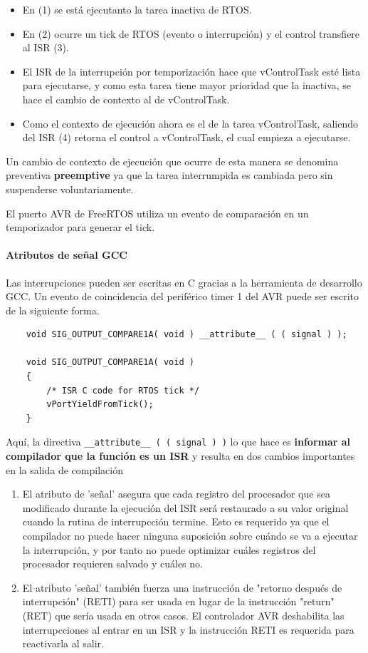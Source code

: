 \begin{itemize}
    \item En (1) se está ejecutanto la tarea inactiva de RTOS.
    \item En (2) ocurre un tick de RTOS (evento o interrupción) y el control transfiere al ISR (3).
    \item El ISR de la interrupción por temporización hace que vControlTask esté lista para ejecutarse, y como esta tarea tiene mayor prioridad que la inactiva, se hace el cambio de contexto al de vControlTask.
    \item Como el contexto de ejecución ahora es el de la tarea vControlTask, saliendo del ISR (4) retorna el control a vControlTask, el cual empieza a ejecutarse.
\end{itemize}

Un cambio de contexto de ejecución que ocurre de esta manera se denomina preventiva \textbf{preemptive} ya que la tarea interrumpida es cambiada pero sin suspenderse voluntariamente.

El puerto AVR de FreeRTOS utiliza un evento de comparación en un temporizador para generar el tick.

\paragraph{Atributos de señal GCC}

Las interrupciones pueden ser escritas en C gracias a la herramienta de desarrollo GCC. Un evento de coincidencia del periférico timer 1 del AVR puede ser escrito de la siguiente forma.

\begin{verbatim}
    void SIG_OUTPUT_COMPARE1A( void ) __attribute__ ( ( signal ) );
    
    void SIG_OUTPUT_COMPARE1A( void )
    {
        /* ISR C code for RTOS tick */
        vPortYieldFromTick();
    }
\end{verbatim}

Aquí, la directiva \texttt{\_\_attribute\_\_ ( ( signal ) )} lo que hace es \textbf{informar al compilador que la función es un ISR } y resulta en dos cambios importantes en la salida de compilación 

\begin{enumerate}
    \item El atributo de 'señal' asegura que cada registro del procesador que sea modificado durante la ejecución del ISR será restaurado a su valor original cuando la rutina de interrupcción termine. Esto es requerido ya que el compilador no puede hacer ninguna suposición sobre cuándo se va a ejecutar la interrupción, y por tanto no puede optimizar cuáles registros del procesador requieren salvado y cuáles no.
    \item El atributo 'señal' también fuerza una instrucción de "retorno después de interrupción" (RETI) para ser usada en lugar de la instrucción "return" (RET) que sería usada en otros casos. El controlador AVR deshabilita las interrupcciones al entrar en un ISR y la instrucción RETI es requerida para reactivarla al salir.
\end{enumerate}

